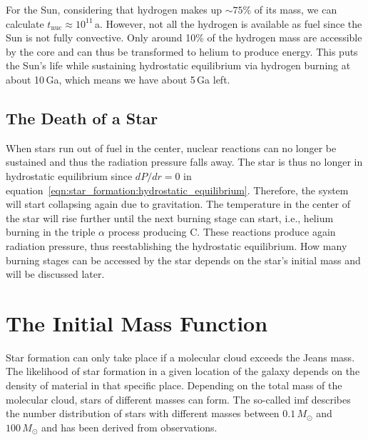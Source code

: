 For the Sun, considering that hydrogen makes up $\sim75$\% of its mass, we can calculate $t_\mathrm{nuc} \approx 10^{11}$\,a. However, not all the hydrogen is available as fuel since the Sun is not fully convective. Only around 10\% of the hydrogen mass are accessible by the core and can thus be transformed to helium to produce energy. This puts the Sun's life while sustaining hydrostatic equilibrium via hydrogen burning at about 10\,Ga, which means we have about 5\,Ga left.


\subsection{The Death of a Star}

When stars run out of fuel in the center, nuclear reactions can no longer be sustained and thus the radiation pressure falls away. The star is thus no longer in hydrostatic equilibrium since $dP/dr = 0$ in equation~\eqref{eqn:star_formation:hydrostatic_equilibrium}. Therefore, the system will start collapsing again due to gravitation. The temperature in the center of the star will rise further until the next burning stage can start, i.e., helium burning in the triple $\alpha$ process producing C. These reactions produce again radiation pressure, thus reestablishing the hydrostatic equilibrium. How many burning stages can be accessed by the star depends on the star's initial mass and will be discussed later. 

    

\section{The Initial Mass Function}

Star formation can only take place if a molecular cloud exceeds the Jeans mass. The likelihood of star formation in a given location of the galaxy depends on the density of material in that specific place. Depending on the total mass of the molecular cloud, stars of different masses can form. The so-called \ac{imf} describes the number distribution of stars with different masses between $0.1\,M_\odot$ and $100\,M_\odot$ and has been derived from observations. 

